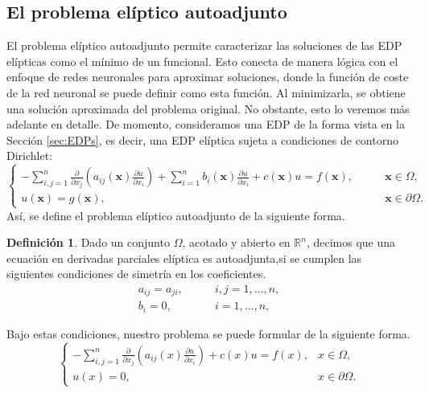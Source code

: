 \documentclass[a4paper,11pt,spanish, twoside, leqno]{tfg-uam}
\theoremstyle{definition}
\newtheorem{defin}[teor]{Definici\'on}
\begin{document}
\subsection{El problema elíptico autoadjunto}\label{sec:ProblemaAutoadjunto}

El problema elíptico autoadjunto  permite caracterizar las soluciones de las EDP elípticas como el mínimo de un funcional. Esto conecta de manera lógica con el enfoque de redes neuronales para aproximar soluciones, donde la función de coste de la red neuronal se puede definir como esta función. Al minimizarla, se obtiene una solución aproximada del problema original. No obstante, esto lo veremos más adelante en detalle. De momento, consideramos una EDP de la forma vista en la Sección \ref{sec:EDPs}, es decir, una EDP elíptica sujeta a condiciones de contorno Dirichlet:
\begin{equation} 
    \begin{cases} -\sum_{i,j=1}^{n} \frac{\partial}{\partial x_j}\left( a_{ij}(\mathbf{x})\frac{\partial u}{\partial x_i}\right) + \sum_{i=1}^{n} b_i(\mathbf{x})\frac{\partial u}{\partial x_i} + c(\mathbf{x})u = f(\mathbf{x}), &\qquad \mathbf{x}\in\Omega,\\ u(\mathbf{x}) = g(\mathbf{x}), &\qquad \mathbf{x}\in\partial\Omega. 
    \end{cases} 
\end{equation} 
Así, se define el problema elíptico autoadjunto de la siguiente forma.
\begin{mdframed}
\begin{defin}
    Dado un conjunto $\Omega$, acotado y abierto en $\mathbb{R}^n$, decimos que una ecuación en derivadas parciales elíptica es autoadjunta,si se cumplen las siguientes condiciones de simetría en los coeficientes.
    \begin{equation}\label{eq:simetria_a}
        \begin{split}
            a_{ij} = a_{ji},\qquad &i,j = 1,\dots,n,\\
            b_i = 0, \qquad &i = 1,\dots,n,
        \end{split}
    \end{equation}
\end{defin}
\end{mdframed}
Bajo estas condiciones, nuestro problema se puede formular de la siguiente forma.
\begin{equation} \label{eq:ProblemaAutoadjuntoFuerte}
    \begin{cases}
        -\sum_{i,j=1}^{n} \frac{\partial}{\partial x_j}\left( a_{ij}(x)\frac{\partial u}{\partial x_i}\right) + c(x)u = f(x), & x\in\Omega,\\
        u(x) = 0, & x\in\partial\Omega.
    \end{cases}
\end{equation}
\end{document}
